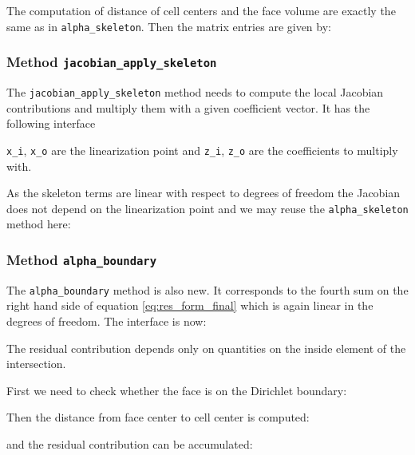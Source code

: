 \documentclass[a4paper,12pt]{article}
\begin{document}
The computation of distance of cell centers and the face volume are
exactly the same as in \lstinline{alpha_skeleton}.
Then the matrix entries are given by:


\subsubsection*{Method \lstinline{jacobian_apply_skeleton}}

The \lstinline{jacobian_apply_skeleton} method needs to 
compute the local Jacobian contributions and multiply them with 
a given coefficient vector. It has the following interface

\lstinline{x_i}, \lstinline{x_o} are the linearization point
and \lstinline{z_i}, \lstinline{z_o} are the coefficients to multiply with.

As the skeleton terms are linear with respect to degrees of freedom
the Jacobian does not depend on the linearization point and
we may reuse the \lstinline{alpha_skeleton} method here:


\subsubsection*{Method \lstinline{alpha_boundary}}

The \lstinline{alpha_boundary} method is also new. It corresponds
to the fourth sum on the right hand side of equation \eqref{eq:res_form_final}
which is again linear in the degrees of freedom.
The interface is now:

The residual contribution depends only on quantities on the inside
element of the intersection.

First we need to check whether the face is on the Dirichlet boundary:


Then the distance from face center to cell center is computed:

and the residual contribution can be accumulated:

\end{document}
